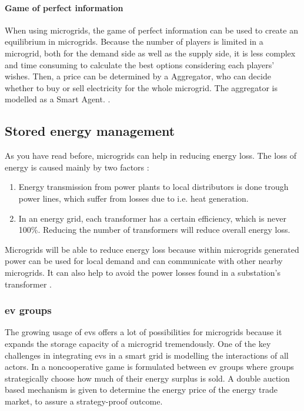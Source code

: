 \paragraph{Game of perfect information}
When using microgrids, the game of perfect information can be used to create an equilibrium in microgrids. Because the number of players is limited in a microgrid, both for the demand side as well as the supply side, it is less complex and time consuming to calculate the best options considering each players' wishes. Then, a price can be determined by a Aggregator, who can decide whether to buy or sell electricity for the whole microgrid. The aggregator is modelled as a Smart Agent. \cite{MicrogridModellingPetrosAristidou}.


\subsection{Stored energy management}
As you have read before, microgrids can help in reducing energy loss. The loss of energy is caused mainly by two factors \cite{EnergyLossURL}: 

\begin{enumerate}
\item Energy transmission from power plants to local distributors is done trough power lines, which suffer from losses due to i.e. heat generation\cite{LasseterPaigi2004}.
\item In an energy grid, each transformer has a certain efficiency, which is never 100\%. Reducing the number of transformers will reduce overall energy loss.
\end{enumerate}

Microgrids will be able to reduce energy loss because within microgrids generated power can be used for local demand and can communicate with other nearby microgrids. It can also help to avoid the power losses found in a substation's transformer \cite{keypaper}.

\subsubsection{\ac{ev} groups}
The growing usage of \ac{ev}s offers a lot of possibilities for microgrids because it expands the storage capacity of a microgrid tremendously. One of the key challenges in integrating \ac{ev}s in a smart grid is modelling the interactions of all actors. In \cite{SaadHanPoorEtAl2011} a noncooperative game is formulated between \ac{ev} groups where groups strategically choose how much of their energy surplus is sold. A double auction based mechanism is given to determine the energy price of the energy trade market, to assure a strategy-proof outcome. 





